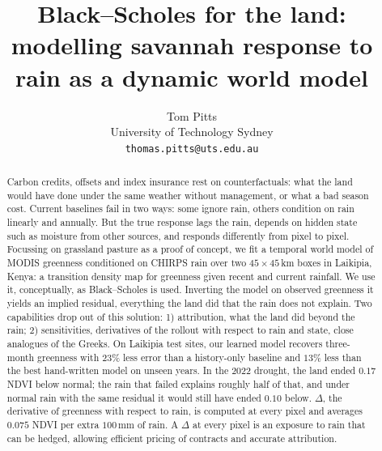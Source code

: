 \documentclass{article}
\title{Black--Scholes for the land:\\ modelling savannah response to rain as a dynamic world model}
\author{Tom Pitts\\ University of Technology Sydney\\ \texttt{thomas.pitts@uts.edu.au}}
\begin{document}
\maketitle

\begin{abstract}
Carbon credits, offsets and index insurance rest on counterfactuals: what the land would have done under the same weather without management, or what a bad season cost. Current baselines fail in two ways: some ignore rain, others condition on rain linearly and annually. But the true response lags the rain, depends on hidden state such as moisture from other sources, and responds differently from pixel to pixel. Focussing on grassland pasture as a proof of concept, we fit a temporal world model of MODIS greenness conditioned on CHIRPS rain over two $45\times45$\,km boxes in Laikipia, Kenya: a transition density map for greenness given recent and current rainfall. We use it, conceptually, as Black--Scholes is used. Inverting the model on observed greenness it yields an implied residual, everything the land did that the rain does not explain. Two capabilities drop out of this solution: 1) attribution, what the land did beyond the rain; 2) sensitivities, derivatives of the rollout with respect to rain and state, close analogues of the Greeks. On Laikipia test sites, our learned model recovers three-month greenness with $23\%$ less error than a history-only baseline and $13\%$ less than the best hand-written model on unseen years. In the 2022 drought, the land ended $0.17$ NDVI below normal; the rain that failed explains roughly half of that, and under normal rain with the same residual it would still have ended $0.10$ below. $\Delta$, the derivative of greenness with respect to rain, is computed at every pixel and averages $0.075$ NDVI per extra $100$\,mm of rain. A $\Delta$ at every pixel is an exposure to rain that can be hedged, allowing efficient pricing of contracts and accurate attribution.
\end{abstract}
\end{document}
